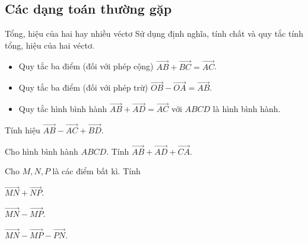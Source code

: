 \subsection{Các dạng toán thường gặp}
\begin{dang}{Tổng, hiệu của hai hay nhiều véctơ}
    Sử dụng định nghĩa, tính chất và quy tắc tính tổng, hiệu của hai véctơ.
    \begin{itemize}
        \item Quy tắc ba điểm (đối với phép cộng) $\overrightarrow{AB}+\overrightarrow{BC}=\overrightarrow{AC}$.
        \item Quy tắc ba điểm (đối với phép trừ) $\overrightarrow{OB}-\overrightarrow{OA}=\overrightarrow{AB}$.
        \item Quy tắc hình bình hành $\overrightarrow{AB}+\overrightarrow{AD}=\overrightarrow{AC}$ với $ABCD$ là hình bình hành.
    \end{itemize}
\end{dang}
\begin{vd} %
	Tính hiệu $\vec{AB}-\vec{AC}+\vec{BD}$.
\end{vd}
\begin{vd} %
	Cho hình bình hành $ABCD$. Tính $\vec{AB}+\vec{AD}+\vec{CA}$.
\end{vd}
\begin{vd}%
    Cho $M,N,P$ là các điểm bất kì. Tính
    \begin{listEX}[3]
        \item $\vec{MN}+\vec{NP}$.
        \item $\vec{MN}-\vec{MP}$.
        \item $\vec{MN}-\vec{MP}-\vec{PN}$.
    \end{listEX}
\end{vd}
